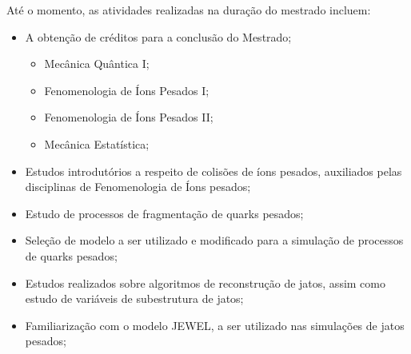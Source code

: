 Até o momento, as atividades realizadas na duração do mestrado incluem:

\begin{itemize}
\item A obtenção de créditos para a conclusão do Mestrado;
\begin{itemize}
\item Mecânica Quântica I;
\item Fenomenologia de Íons Pesados I;
\item Fenomenologia de Íons Pesados II;
\item Mecânica Estatística;
\end{itemize}
\item Estudos introdutórios a respeito de colisões de íons pesados, auxiliados pelas disciplinas de Fenomenologia de Íons pesados;
\item Estudo de processos de fragmentação de quarks pesados;
\item Seleção de modelo a ser utilizado e modificado para a simulação de processos de quarks pesados;
\item Estudos realizados sobre algoritmos de reconstrução de jatos, assim como estudo de variáveis de subestrutura de jatos;
\item Familiarização com o modelo JEWEL, a ser utilizado nas simulações de jatos pesados;
\end{itemize}